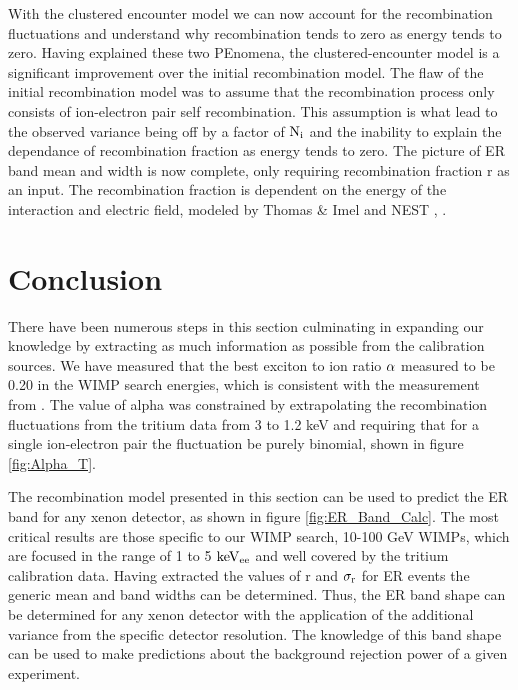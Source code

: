 With the clustered encounter model we can now account for the recombination fluctuations and understand why recombination tends to zero as energy tends to zero. Having explained these two PEnomena, the clustered-encounter model is a significant improvement over the initial recombination model. The flaw of the initial recombination model was to assume that the recombination process only consists of ion-electron pair self recombination. This assumption is what lead to the observed variance being off by a factor of $\rm N_i$ and the inability to explain the dependance of recombination fraction as energy tends to zero. The picture of ER band mean and width is now complete, only requiring recombination fraction r as an input. The recombination fraction is dependent on the energy of the interaction and electric field, modeled by Thomas \& Imel \cite{Thomas_Imel} and NEST \cite{NEST}, \cite{NEST_2013}. 

\newpage

\section{Conclusion}


There have been numerous steps in this section culminating in expanding our knowledge by extracting as much information as possible from the calibration sources. We have measured that the best exciton to ion ratio $\rm \alpha$ measured to be 0.20 in the WIMP search energies, which is consistent with the measurement from \cite{Doke_alpha}. The value of alpha was constrained by extrapolating the recombination fluctuations from the tritium data from 3 to 1.2 keV and requiring that for a single ion-electron pair the fluctuation be purely binomial, shown in figure \ref{fig:Alpha_T}.

The recombination model presented in this section can be used to predict the ER band for any xenon detector, as shown in figure \ref{fig:ER_Band_Calc}. The most critical results are those specific to our WIMP search, 10-100 GeV WIMPs, which are focused in the range of 1 to 5 $\rm keV_{ee}$ and well covered by the tritium calibration data. Having extracted the values of r and $\rm \sigma_r$ for ER events the generic mean and band widths can be determined. Thus, the ER band shape can be determined for any xenon detector with the application of the additional variance from the specific detector resolution. The knowledge of this band shape can be used to make predictions about the background rejection power of a given experiment. 

